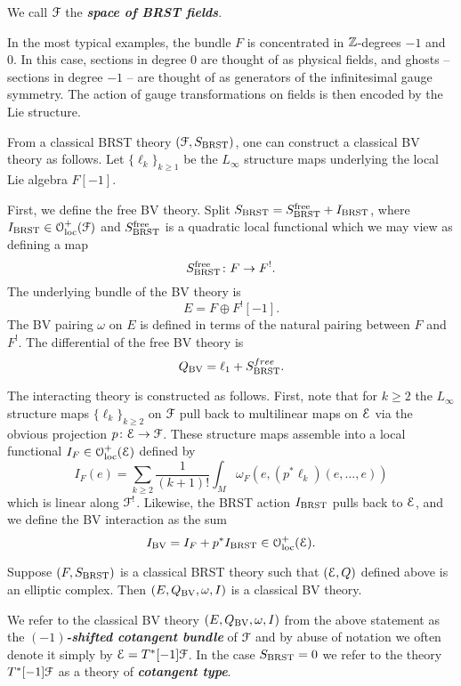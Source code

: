 \documentclass[10pt, oneside]{article}
\newcommand{\defterm}[1]{\textbf{\emph{#1}}}
\begin{document}
We call $\mathcal F$ the \defterm{space of BRST fields}.

\begin{remark}
In the most typical examples, the bundle $F$ is concentrated in $\mathbb Z$-degrees $-1$ and 0.  In this case, sections in degree 0 are thought of as physical fields, and ghosts -- sections in degree $-1$ -- are thought of as generators of the infinitesimal gauge symmetry.  The action of gauge transformations on fields is then encoded by the Lie structure.
\end{remark}

From a classical BRST theory $(\mathcal F, S_{\mathrm{BRST}})$, one can construct a classical BV theory as follows. Let $\{\ell_k\}_{k\geq 1}$ be the $L_\infty$ structure maps underlying the local Lie algebra $F[-1]$.

First, we define the free BV theory. Split $S_{\mathrm{BRST}} = S^{\mathrm{free}}_{\mathrm{BRST}} + I_{\mathrm{BRST}}$, where $I_{\mathrm{BRST}}\in\mathcal{O}_{\rm loc}^+(\mathcal F)$ and $S^{\mathrm{free}}_{\mathrm{BRST}}$ is a quadratic local functional which we may view as defining a map
\[S^{\mathrm{free}}_{\mathrm{BRST}}\colon F\rightarrow F^!.\]
The underlying bundle of the BV theory is
\[
E = F \oplus F^! [-1].
\]
The BV pairing $\omega$ on $E$ is defined in terms of the natural pairing between $F$ and $F^!$.
The differential of the free BV theory is
\[Q_{\mathrm{BV}} = \ell_1 + S^{free}_{\mathrm{BRST}}.
\]


The interacting theory is constructed as follows. First, note that for $k \geq 2$ the $L_\infty$ structure maps $\{\ell_k\}_{k \geq 2}$ on $\mathcal F$ pull back to multilinear maps on $\mathcal E$ via the obvious projection $p\colon \mathcal E\rightarrow \mathcal F$. These structure maps assemble into a local functional $I_F \in \mathcal{O}_{\rm loc}^+(\mathcal E)$ defined by
\[
I_F (e) = \sum_{k \geq 2} \frac{1}{(k+1)!} \int_M \omega_F(e, (p^*\ell_k) (e, \ldots, e))
\] 
which is linear along $\mathcal F^!$. Likewise, the BRST action $I_{\mathrm{BRST}}$ pulls back to $\mathcal E$, and we define the BV interaction as the sum
\[
I_{\mathrm{BV}} = I_{F} + p^* I_{\mathrm{BRST}} \in \mathcal{O}_{\rm loc}^+(\mathcal E) .
\]

\begin{lemma}
Suppose $(F, S_{\mathrm{BRST}})$ is a classical BRST theory such that $(\mathcal E, Q)$ defined above is an elliptic complex. Then $(E, Q_{\mathrm{BV}}, \omega, I)$ is a classical BV theory.
\end{lemma}

We refer to the classical BV theory $(E, Q_{\mathrm{BV}}, \omega, I)$ from the above statement as the \defterm{$(-1)$-shifted cotangent bundle} of $\mathcal F$ and by abuse of notation we often denote it simply by $\mathcal E = T^*[-1] \mathcal F$. In the case $S_{\mathrm{BRST}} = 0$ we refer to the theory $T^*[-1] \mathcal F$ as a theory of \defterm{cotangent type}.
\end{document}
